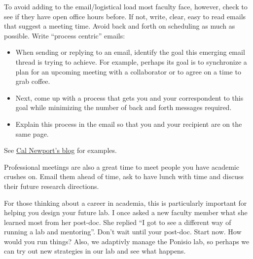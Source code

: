 \documentclass[12pt]{article}
\begin{document}
To avoid adding to the email/logistical load most faculty face,
however, check to see if they have open office hours before. If not,
write, clear, easy to read emails that suggest a meeting time. Avoid
back and forth on scheduling as much as possible. Write ``process
centric'' emails:
\begin{itemize}
\item When sending or replying to an email, identify the goal this
  emerging email thread is trying to achieve. For example, perhaps its
  goal is to synchronize a plan for an upcoming meeting with a
  collaborator or to agree on a time to grab coffee.
\item Next, come up with a process that gets you and your
  correspondent to this goal while minimizing the number of back and
  forth messages required.
\item Explain this process in the email so that you and your recipient
  are on the same page.
\end{itemize}

See
\href{http://calnewport.com/blog/2016/04/19/write-longer-emails/}{Cal
  Newport's blog} for examples.


Professional meetings are also a great time to meet people you have
academic crushes on. Email them ahead of time, ask to have lunch with
time and discuss their future research directions.

For those thinking about a career in academia, this is particularly
important for helping you design your future lab. I once asked a new
faculty member what she learned most from her post-doc. She replied
``I got to see a different way of running a lab and mentoring''. Don't
wait until your post-doc. Start now.  How would you run things? Also,
we adaptivly manage the Ponisio lab, so perhaps we can try out new
strategies in our lab and see what happens.
\end{document}

